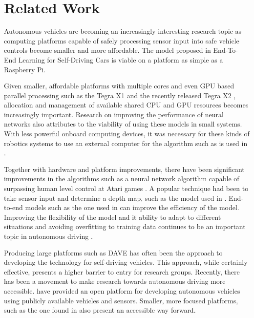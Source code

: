 \section{Related Work}\label{sec:related}

Autonomous vehicles are becoming an increasingly interesting research topic as computing platforms capable of safely processing sensor input into safe vehicle controls become smaller and more affordable.  The model proposed in End-To-End Learning for Self-Driving Cars \cite{Bojarski2016} is viable on a platform as simple as a Raspberry Pi.

Given smaller, affordable platforms with multiple cores and even GPU based parallel processing such as the Tegra X1 \cite{NVIDIA2015} and the recently released Tegra X2 \cite{Amert2017}, allocation and management of available shared CPU and GPU resources \cite{Kim2016} becomes increasingly important.  Research on improving the performance of neural networks \cite{Jouppi2017} also attributes to the viability of using these models in small systems.  With less powerful onboard computing devices, it was necessary for these kinds of robotics systems to use an external computer for the algorithm such as is used in \cite{LeCun:2005}.

Together with hardware and platform improvements, there have been significant improvements in the algorithms such as a neural network algorithm capable of surpassing human level control at Atari games \cite{DBLP}.  A popular technique had been to take sensor input and determine a depth map, such as the model used in \cite{Michels:2005}. End-to-end models such as the one used in \cite{Bojarski2016} can improve the efficiency of the model.  Improving the flexibility of the model and it ability to adapt to different situations and avoiding overfitting to training data continues to be an important topic in autonomous driving \cite{Pomerleau1989}.

Producing large platforms such as DAVE \cite{LeCun:04} has often been the approach to developing the technology for self-driving vehicles.  This approach, while certainly effective, presents a higher barrier to entry for research groups.  Recently, there has been a movement to make research towards autonomous driving more accessible.  \cite{Kato:2015} have provided an open platform for developing autonomous vehicles using publicly available vehicles and sensors.  Smaller, more focused platforms, such as the one found in \cite{Michels:2005} also present an accessible way forward.

